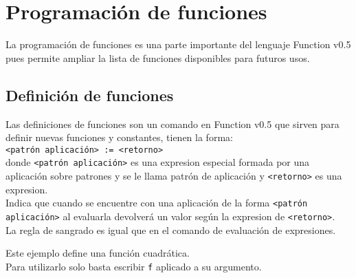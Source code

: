 
\titlespacing{\subsection}{0pt}{10pt}{0pt}

\chapter{Programación de funciones}
   La programación de funciones es una parte importante del lenguaje Function v0.5 pues permite ampliar la lista de funciones disponibles para futuros usos.
   
   \section{Definición de funciones}
      Las definiciones de funciones son un comando en Function v0.5 que sirven para definir nuevas funciones y constantes, tienen la forma:
      \\
      
      \texttt{<patrón aplicación>~:=~<retorno>}
      \\
      
      donde \texttt{<patrón aplicación>} es una expresion especial formada por una aplicación sobre patrones y se le llama patrón de aplicación y \texttt{<retorno>} es una expresion.
      \\
      
      Indica que cuando se encuentre con una aplicación de la forma \texttt{<patrón aplicación>} al evaluarla devolverá un valor según la expresion de \texttt{<retorno>}.
      \\
      
      La regla de sangrado es igual que en el comando de evaluación de expresiones.
      
      \begin{fxcode}
      \end{fxcode}
      
      Este ejemplo define una función cuadrática.
      \\
      
      Para utilizarlo solo basta escribir \texttt{f} aplicado a su argumento.
      
